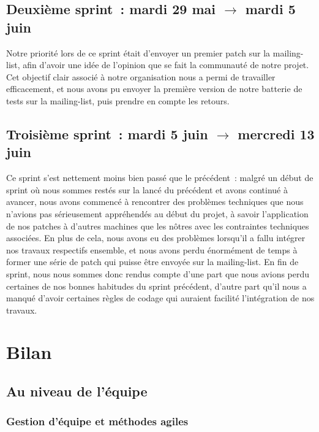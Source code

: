 \documentclass[11pt]{article}
\begin{document}
\subsection{Deuxième sprint~: mardi 29 mai $\rightarrow$ mardi 5 juin}

Notre priorité lors de ce sprint était d'envoyer un premier patch sur
la mailing-list, afin d'avoir une idée de l'opinion que se fait la
communauté de notre projet. Cet objectif clair associé à notre
organisation nous a permi de travailler efficacement, et nous avons pu
envoyer la première version de notre batterie de tests sur la
mailing-list, puis prendre en compte les retours.

\subsection{Troisième sprint~: mardi 5 juin $\rightarrow$ mercredi 13 juin}

Ce sprint s'est nettement moins bien passé que le précédent~: malgré
un début de sprint où nous sommes restés sur la lancé du précédent et
avons continué à avancer, nous avons commencé à rencontrer des
problèmes techniques que nous n'avions pas sérieusement appréhendés au
début du projet, à savoir l'application de nos patches à d'autres
machines que les nôtres avec les contraintes techniques
associées. En plus de cela, nous avons eu des problèmes lorsqu'il a
fallu intégrer nos travaux respectifs ensemble, et nous avons perdu
énormément de temps à former une série de patch qui puisse être
envoyée sur la mailing-list. En fin de sprint, nous nous sommes donc
rendus compte d'une part que nous avions perdu certaines de nos bonnes
habitudes du sprint précédent, d'autre part qu'il nous a manqué
d'avoir certaines règles de codage qui auraient facilité l'intégration
de nos travaux.

\section{Bilan}

\subsection*{Au niveau de l'équipe}

\subsubsection*{Gestion d'équipe et méthodes agiles}
\end{document}

